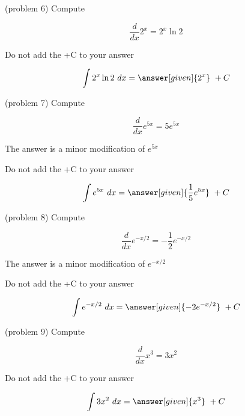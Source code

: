 \documentclass[handout]{ximera}
\begin{document}
\begin{problem}(problem 6)
Compute 

\begin{hint}
\[
\frac{d}{dx} 2^x = 2^x \ln 2
\]
\end{hint}
\begin{hint}
\begin{center}
Do not add the +C to your answer
\end{center}
\end{hint}

\[
\int 2^x \ln 2 \ dx =
\answer[given]{2^x} \ + C
\]
\end{problem}

\begin{problem}(problem 7)
Compute 

\begin{hint}
\[
\frac{d}{dx} e^{5x} = 5e^{5x}
\]
\end{hint}
\begin{hint}
The answer is a minor modification of $e^{5x}$
\end{hint}
\begin{hint}
\begin{center}
Do not add the +C to your answer
\end{center}
\end{hint}

\[
\int e^{5x} \ dx =
\answer[given]{\frac15 e^{5x}} \ + C
\]
\end{problem}

\begin{problem}(problem 8)
Compute 

\begin{hint}
\[
\frac{d}{dx} e^{-x/2} = -\frac12 e^{-x/2}
\]
\end{hint}
\begin{hint}
The answer is a minor modification of $e^{-x/2}$
\end{hint}
\begin{hint}
\begin{center}
Do not add the +C to your answer
\end{center}
\end{hint}

\[
\int e^{-x/2} \ dx =
\answer[given]{-2 e^{-x/2}} \ + C
\]
\end{problem}



\begin{problem}(problem 9)
Compute 

\begin{hint}
\[
\frac{d}{dx} x^3 = 3x^2
\]
\end{hint}
\begin{hint}
\begin{center}
Do not add the +C to your answer
\end{center}
\end{hint}

\[
\int 3x^2 \ dx =
\answer[given]{x^3} \ + C
\]
\end{problem}
\end{document}
